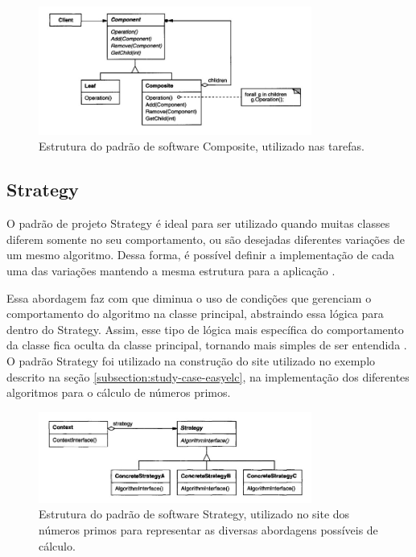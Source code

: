 \documentclass[12pt]{tcc}
\begin{document}
		\begin{figure}[H]
			\centering
			\includegraphics[width=0.8\textwidth]{figures/composite.jpeg}
			\caption[Estrutura do padrão de software Composite]{Estrutura do padrão de software Composite, utilizado nas tarefas.}
			\label{fig:composite}
		\end{figure}

		\subsection{Strategy}
		\label{subsection:strategy}

		O padrão de projeto Strategy é ideal para ser utilizado quando muitas classes diferem somente no seu comportamento, ou são desejadas diferentes variações de um mesmo algoritmo. Dessa forma, é possível definir a implementação de cada uma das variações mantendo a mesma estrutura para a aplicação \citep{gamma1994design}. 

		Essa abordagem faz com que diminua o uso de condições que gerenciam o comportamento do algoritmo na classe principal, abstraindo essa lógica para dentro do Strategy. Assim, esse tipo de lógica mais específica do comportamento da classe fica oculta da classe principal, tornando mais simples de ser entendida  \citep{gamma1994design}. O padrão Strategy foi utilizado na construção do site utilizado no exemplo descrito na seção \ref{subsection:study-case-easyelc}, na implementação dos diferentes algoritmos para o cálculo de números primos.

		\begin{figure}[H]
			\centering
			\includegraphics[width=0.8\textwidth]{figures/strategy.jpeg}
			\caption[Estrutura do padrão de software Strategy]{Estrutura do padrão de software Strategy, utilizado no site dos números primos para representar as diversas abordagens possíveis de cálculo.}
			\label{fig:strategy}
		\end{figure}
\end{document}
